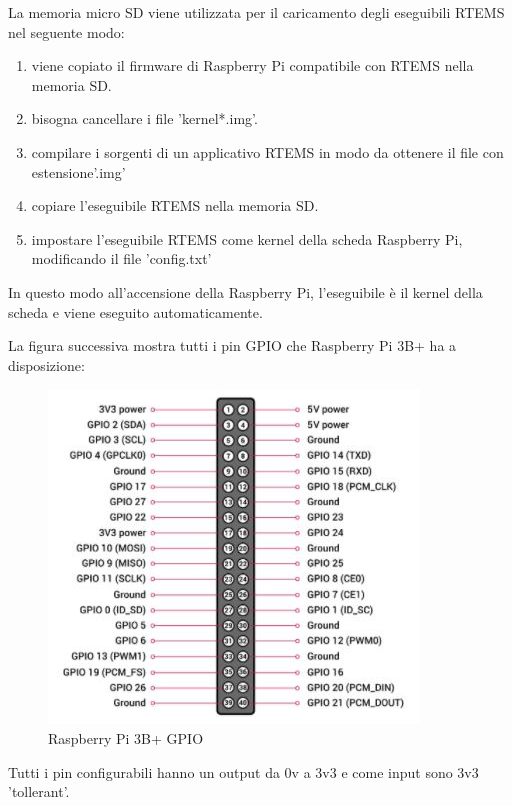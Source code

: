 \documentclass[12pt, a4paper, titlepage, oneside]{book}
\begin{document}
\begin{flushleft}
La memoria micro SD viene utilizzata per il caricamento degli eseguibili RTEMS nel seguente modo:
\begin{enumerate}
    \item viene copiato il firmware di Raspberry Pi compatibile con RTEMS nella memoria SD.
    \item bisogna cancellare i file 'kernel*.img'. 
    \item compilare i sorgenti di un applicativo RTEMS in modo da ottenere il file con estensione'.img' 
    \item copiare l'eseguibile RTEMS nella memoria SD.
    \item impostare l'eseguibile RTEMS come kernel della scheda Raspberry Pi, modificando il file 'config.txt'
\end{enumerate}
In questo modo all'accensione della Raspberry Pi, l'eseguibile è il kernel della scheda e viene eseguito automaticamente.

\newpage
La figura successiva mostra tutti i pin GPIO che Raspberry Pi 3B+ ha a disposizione:
\begin{figure}[h]
    \centering
    \includegraphics[scale = 1.50]{RPi3B_GPIO.JPG}
    \caption{Raspberry Pi 3B+ GPIO}
    \label{fig:RPi3B_GPIO}
\end{figure}

Tutti i pin configurabili hanno un output da 0v a 3v3 e come input sono 3v3 'tollerant'.


\newpage


\end{flushleft}
\end{document}
